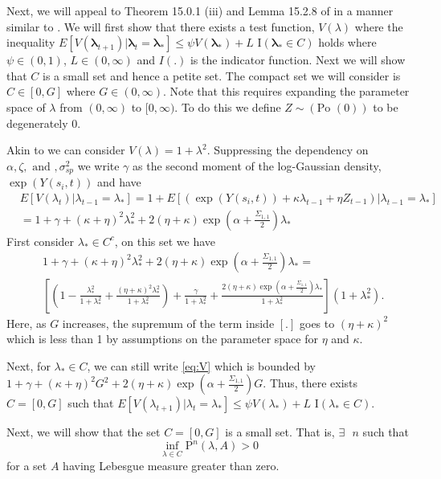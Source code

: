 \documentclass[11pt]{isuthesis}
\begin{document}
Next, we will appeal to Theorem 15.0.1 (iii) and Lemma 15.2.8 of \cite{meyn2012markov} in a manner similar to \cite{fokianos2009poisson}. We will first show that there exists a test function, $V(\lambda)$ where the inequality $E[V(\boldsymbol{\lambda}_{t+1})|\boldsymbol{\lambda}_t=\boldsymbol{\lambda_*}]\leq \psi V(\boldsymbol{\lambda_*})+L \mbox{ I}(\boldsymbol{\lambda_*} \in C)$ holds where $\psi \in (0,1)$, $L \in (0,\infty)$ and $I(.)$ is the indicator function.  Next we will show that $C$ is a small set and hence a petite set. The compact set we will consider is $C \in [0,G]$ where  $G \in (0,\infty)$.  Note that this requires expanding the parameter space of $\lambda$ from $(0,\infty)$ to $[0,\infty)$.  To do this we define $Z\sim(\mbox{Po }(0))$ to be degenerately $0$.

Akin to \cite{fokianos2009poisson} we can consider $V(\lambda)=1+\lambda^2$.  Suppressing the dependency on $\alpha, \zeta,\mbox{ and },\sigma_{sp}^2$ we write $\gamma$ as the second moment of the log-Gaussian density, $\exp(Y(s_i,t))$ and have
\begin{align}
	& E[V(\lambda_t)|\lambda_{t-1}=\lambda_*]= 1+E[\left(\exp(Y(s_i,t))+\kappa\lambda_{t-1}+\eta Z_{t-1}\right)|\lambda_{t-1}=\lambda_*]\\
	& = 1+\gamma+(\kappa+\eta)^2\lambda_*^2+2(\eta+\kappa)\exp(\alpha+\frac{\Sigma_{1,1}}{2})\lambda_* \label{eq:V}
\end{align}
First consider $\lambda_* \in C^c$, on this set we have
\begin{align}
	& 1+\gamma+(\kappa+\eta)^2\lambda_*^2+2(\eta+\kappa)\exp(\alpha+\frac{\Sigma_{1,1}}{2})\lambda_* =\nonumber\\ & \left[\left(1-\frac{\lambda_*^2}{1+\lambda_*^2}+\frac{(\eta+\kappa)^2 \lambda_*^2}{1+\lambda_*^2}\right) + \frac{\gamma}{1+\lambda_*^2}+\frac{2(\eta+\kappa)\exp(\alpha+\frac{\Sigma_{1,1}}{2})\lambda_*}{1+\lambda_*^2}\right](1+\lambda_*^2).
\end{align}
Here, as $G$ increases, the supremum of the term inside $\left[.\right]$ goes to $(\eta+\kappa)^2$ which is less than 1 by assumptions on the parameter space for $\eta$ and $\kappa$.  

Next, for $\lambda_* \in C$, we can still write \eqref{eq:V} which is bounded by $1+\gamma+(\kappa+\eta)^2 G^2 + 2(\eta+\kappa)\exp(\alpha+\frac{\Sigma_{1,1}}{2})G$.  Thus, there exists $C=[0,G]$ such that $E[V(\lambda_{t+1})|\lambda_t=\lambda_*]\leq \psi V(\lambda_*)+L \mbox{ I}(\lambda_*\in C)$.

Next, we will show that the set $C=[0,G]$ is a small set.  That is, $\exists \mbox{ }n$ such that
\begin{equation}
	\inf_{\lambda \in C}\mbox{P}^n(\lambda,A)>0
\end{equation}
for a set $A$ having Lebesgue measure greater than zero.
\end{document}
